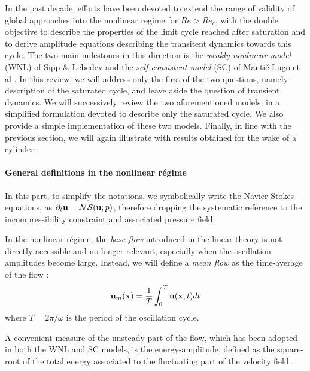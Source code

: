 \documentclass[twocolumn,10pt]{asme2ej}
\newcommand{\be}[1]{ \begin{equation} \label{#1}}
\newcommand{\ee}{\end{equation}}
\begin{document}
In the past decade, efforts have been devoted to extend the range of validity of global approaches into the nonlinear regime for $Re>Re_c$, with the double objective to describe the properties of the limit cycle reached after saturation and to derive amplitude equations describing the transitent dynamics towards this cycle. The two main milestones in this direction is the {\em weakly nonlinear model}  (WNL) of Sipp \& Lebedev \cite{SippLebedev} and the {\em self-consistent model} (SC) of Manti\v{c}-Lugo et al \cite{MLugo2014}.
 {\color{blue} In this review, we will address only the first of the two questions, namely description of the saturated cycle, and leave aside the question of transient dynamics. We will successively review the two aforementioned models, in a simplified formulation devoted to describe only the saturated cycle. We also provide a simple implementation of these two models. Finally, in line with the previous section, we will again illustrate with results obtained for the wake of a cylinder.
 }
 
 

\paragraph{General definitions in the nonlinear régime}
 
In this part, to simplify the notations, we symbolically write the Navier-Stokes equations, as $\partial_t {\bf u} = {\cal 
NS} ({\bf u};p)$, therefore dropping the systematic reference to the 
incompressibility constraint and associated pressure field. 

In the nonlinear régime, the {\em base flow} introduced in the linear theory is not directly accessible and no longer relevant, especially when the oscillation amplitudes become large. 
Instead, we will define a {\em mean flow}  as the time-average  of the flow :
\be{defumean}
{\bf u}_m({\bf x})  = \frac{1}{T} \int_0^{T}  {\bf u}({\bf x},t)  dt
\ee
where $T = 2\pi/\omega$ is the period of the oscillation cycle. 

A convenient measure of the unsteady part of the flow, which has been adopted in both the WNL and SC models, is the energy-amplitude, defined as the square-root of the total energy associated to the fluctuating part of the velocity field :
\end{document}
